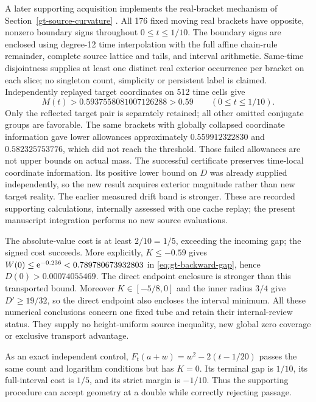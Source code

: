 A later supporting acquisition implements the real-bracket mechanism
of Section~\ref{gt-source-curvature} \cite{gtbrackets}. All 176 fixed
moving real brackets have opposite, nonzero boundary signs throughout
\(0\le t\le1/10\). The boundary signs are enclosed using degree-12
time interpolation with the full affine chain-rule remainder, complete
source lattice and tails, and interval arithmetic. Same-time disjointness
supplies at least one distinct real exterior occurrence per bracket on
each slice; no singleton count, simplicity or persistent label is claimed.
Independently replayed target coordinates on 512 time cells give
\[
 M(t)>0.5937558081007126288>0.59\qquad(0\le t\le1/10).
\]
Only the reflected target pair is separately retained; all other omitted
conjugate groups are favorable. The same brackets with globally collapsed
coordinate information gave lower allowances approximately
\(0.559912322830\) and \(0.582325753776\), which did not reach the
threshold. Those failed allowances are not upper bounds on actual mass.
The successful certificate preserves time-local coordinate information.
Its positive lower bound on \(D\) was already supplied independently,
so the new result acquires exterior magnitude rather than new target
reality. The earlier measured drift band is stronger. These are recorded
supporting calculations, internally assessed with one cache replay; the
present manuscript integration performs no new source evaluations.

The absolute-value cost is at least \(2/10=1/5\), exceeding the incoming
gap; the signed cost succeeds. More explicitly, \(K\le-0.59\)
gives \(W(0)\le\mathrm e^{-0.236}<0.789780673932803\) in
\eqref{eq:gt-backward-gap}, hence \(D(0)>0.00074055469\).
The direct endpoint enclosure is stronger than this transported bound. Moreover \(K\in[-5/8,0]\) and the
inner radius \(3/4\) give \(D'\ge19/32\), so the direct endpoint also
encloses the interval minimum. All these numerical conclusions concern
one fixed tube and retain their internal-review status. They supply no
height-uniform source inequality, new global zero coverage or exclusive
transport advantage.

As an exact independent control, \(F_t(a+w)=w^2-2(t-1/20)\) passes
the same count and logarithm conditions but has \(K=0\).
Its terminal gap is \(1/10\), its full-interval cost is \(1/5\),
and its strict margin is \(-1/10\). Thus the supporting procedure can
accept geometry at a double while correctly rejecting passage.
